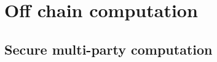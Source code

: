 \chapter{Off chain computation}
\label{off_chain}

\section{Secure multi-party computation}\label{off_chain:mpc}
